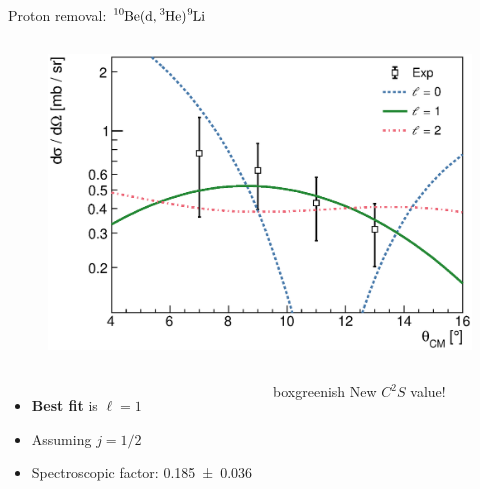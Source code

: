 \documentclass[sans,
frameno, %
mp,
usenames,dvipsnames, %
onlytextwidth, %
t,%
11pt]{beamer}
\newcommand{\iso}[2]{\ce{^{#1}#2}}
\begin{document}
\begin{frame}{Proton removal: $\iso{10}{Be}(\textrm{d}, \iso{3}{He})\iso{9}{Li}$}
{\begin{columns}[t]
{\begin{figure}
                    \centering
                    \includegraphics[width=\textwidth]{figures/Workshop/10Be_d3He_xs_1.eps}
                \end{figure}
            }
        \end{columns}
        \medskip
        \begin{columns}[c]
            {
                \begin{itemize}
                    \item \textbf{Best fit} is $\ell = 1$
                    \item Assuming $j = 1/2$
                    \item Spectroscopic factor: \num{0.185(36)}
                \end{itemize}
            }\hfill
            {
                \begin{beamercolorbox}[sep=1ex, center, rounded=true]{boxgreenish}
                    New $C^2S$ value!
                \end{beamercolorbox}
            }
        \end{columns}
    }
\end{frame}
\end{document}
